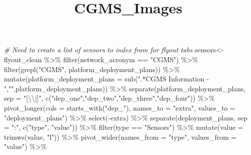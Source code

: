 \documentclass[
]{article}
\title{CGMS\_Images}
\author{}
\date{\vspace{-2.5em}}
\newenvironment{Shaded}{\begin{snugshade}}{\end{snugshade}}
\newcommand{\AttributeTok}[1]{\textcolor[rgb]{0.77,0.63,0.00}{#1}}
\newcommand{\CommentTok}[1]{\textcolor[rgb]{0.56,0.35,0.01}{\textit{#1}}}
\newcommand{\FunctionTok}[1]{\textcolor[rgb]{0.00,0.00,0.00}{#1}}
\newcommand{\NormalTok}[1]{#1}
\newcommand{\OtherTok}[1]{\textcolor[rgb]{0.56,0.35,0.01}{#1}}
\newcommand{\SpecialCharTok}[1]{\textcolor[rgb]{0.00,0.00,0.00}{#1}}
\newcommand{\StringTok}[1]{\textcolor[rgb]{0.31,0.60,0.02}{#1}}
\begin{document}
\maketitle

\begin{Shaded}
\begin{Highlighting}[]
\CommentTok{\# Need to create a list of sensors to index from for flyout tabs}
\NormalTok{sensors}\OtherTok{\textless{}{-}}\NormalTok{ flyout\_clean }\SpecialCharTok{\%\textgreater{}\%}
  \FunctionTok{filter}\NormalTok{(network\_acronym }\SpecialCharTok{==} \StringTok{"CGMS"}\NormalTok{) }\SpecialCharTok{\%\textgreater{}\%}
  \FunctionTok{filter}\NormalTok{(}\FunctionTok{grepl}\NormalTok{(}\StringTok{"CGMS"}\NormalTok{, platform\_deployment\_plans)) }\SpecialCharTok{\%\textgreater{}\%}
  \FunctionTok{mutate}\NormalTok{(}\AttributeTok{platform\_deployment\_plans =} \FunctionTok{sub}\NormalTok{(}\StringTok{".*CGMS Information {-} "}\NormalTok{,}\StringTok{""}\NormalTok{,platform\_deployment\_plans)) }\SpecialCharTok{\%\textgreater{}\%}
  \FunctionTok{separate}\NormalTok{(platform\_deployment\_plans, }\AttributeTok{sep =} \StringTok{"[}\SpecialCharTok{\textbackslash{}\textbackslash{}}\StringTok{|]"}\NormalTok{, }\FunctionTok{c}\NormalTok{(}\StringTok{"dep\_one"}\NormalTok{,}\StringTok{"dep\_two"}\NormalTok{,}\StringTok{"dep\_three"}\NormalTok{,}\StringTok{"dep\_four"}\NormalTok{)) }\SpecialCharTok{\%\textgreater{}\%}
  \FunctionTok{pivot\_longer}\NormalTok{(}\AttributeTok{cols =} \FunctionTok{starts\_with}\NormalTok{(}\StringTok{"dep\_"}\NormalTok{), }\AttributeTok{names\_to =} \StringTok{"extra"}\NormalTok{, }\AttributeTok{values\_to =} \StringTok{"deployment\_plans"}\NormalTok{) }\SpecialCharTok{\%\textgreater{}\%} 
  \FunctionTok{select}\NormalTok{(}\SpecialCharTok{{-}}\NormalTok{extra) }\SpecialCharTok{\%\textgreater{}\%} 
  \FunctionTok{separate}\NormalTok{(deployment\_plans, }\AttributeTok{sep =} \StringTok{":"}\NormalTok{, }\FunctionTok{c}\NormalTok{(}\StringTok{"type"}\NormalTok{, }\StringTok{"value"}\NormalTok{)) }\SpecialCharTok{\%\textgreater{}\%} 
  \FunctionTok{filter}\NormalTok{(type }\SpecialCharTok{==} \StringTok{"Sensors"}\NormalTok{) }\SpecialCharTok{\%\textgreater{}\%}
  \FunctionTok{mutate}\NormalTok{(}\AttributeTok{value =} \FunctionTok{trimws}\NormalTok{(value, }\StringTok{"l"}\NormalTok{)) }\SpecialCharTok{\%\textgreater{}\%}
  \FunctionTok{pivot\_wider}\NormalTok{(}\AttributeTok{names\_from =} \StringTok{"type"}\NormalTok{, }\AttributeTok{values\_from =} \StringTok{"value"}\NormalTok{) }\SpecialCharTok{\%\textgreater{}\%}

\end{Highlighting}
\end{Shaded}
\end{document}
